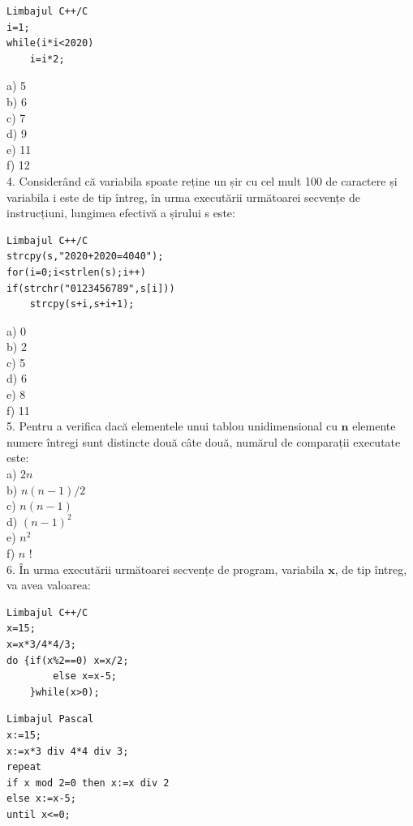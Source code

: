 \documentclass[10pt]{article}
\begin{document}
\begin{verbatim}
Limbajul C++/C
i=1;
while(i*i<2020)
    i=i*2;
\end{verbatim}

a) 5\\
b) 6\\
c) 7\\
d) 9\\
e) 11\\
f) 12\\
4. Considerând că variabila spoate reține un șir cu cel mult 100 de caractere și variabila i este de tip întreg, în urma executării următoarei secvențe de instrucțiuni, lungimea efectivă a șirului s este:

\begin{verbatim}
Limbajul C++/C
strcpy(s,"2020+2020=4040");
for(i=0;i<strlen(s);i++)
if(strchr("0123456789",s[i]))
    strcpy(s+i,s+i+1);
\end{verbatim}

a) 0\\
b) 2\\
c) 5\\
d) 6\\
e) 8\\
f) 11\\
5. Pentru a verifica dacă elementele unui tablou unidimensional cu $\mathbf{n}$ elemente numere întregi sunt distincte două câte două, numărul de comparații executate este:\\
a) $2 n$\\
b) $n(n-1) / 2$\\
c) $n(n-1)$\\
d) $(n-1)^{2}$\\
e) $n^{2}$\\
f) $n$ !\\
6. În urma executării următoarei secvențe de program, variabila $\mathbf{x}$, de tip întreg, va avea valoarea:

\begin{verbatim}
Limbajul C++/C
x=15;
x=x*3/4*4/3;
do {if(x%2==0) x=x/2;
        else x=x-5;
    }while(x>0);
\end{verbatim}

\begin{verbatim}
Limbajul Pascal
x:=15;
x:=x*3 div 4*4 div 3;
repeat
if x mod 2=0 then x:=x div 2
else x:=x-5;
until x<=0;
\end{verbatim}
\end{document}
